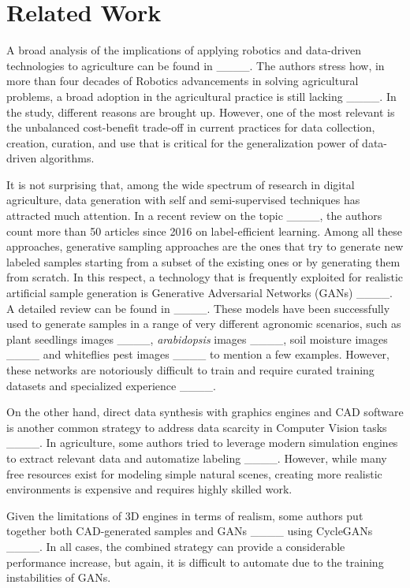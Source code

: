 \section{Related Work}
\label{sec::related}
A broad analysis of the implications of applying robotics and data-driven technologies to agriculture can be found in ____. The authors stress how, in more than four decades of Robotics advancements in solving agricultural problems, a broad adoption in the agricultural practice is still lacking ____. In the study, different reasons are brought up. However, one of the most relevant is the unbalanced cost-benefit trade-off in current practices for data collection, creation, curation, and use that is critical for the generalization power of data-driven algorithms. 

It is not surprising that, among the wide spectrum of research in digital agriculture, data generation with self and semi-supervised techniques has attracted much attention. In a recent review on the topic ____, the authors count more than 50 articles since 2016 on label-efficient learning. Among all these approaches, generative sampling approaches are the ones that try to generate new labeled samples starting from a subset of the existing ones or by generating them from scratch. In this respect, a technology that is frequently exploited for realistic artificial sample generation is Generative Adversarial Networks (GANs) ____. A detailed review can be found in ____. These models have been successfully used to generate samples in a range of very different agronomic scenarios, such as plant seedlings images ____, \textit{arabidopsis} images ____, soil moisture images ____ and whiteflies pest images ____ to mention a few examples. However, these networks are notoriously difficult to train and require curated training datasets and specialized experience ____. 

On the other hand, direct data synthesis with graphics engines and CAD software is another common strategy to address data scarcity in Computer Vision tasks ____. In agriculture, some authors tried to leverage modern simulation engines to extract relevant data and automatize labeling ____. However, while many free resources exist for modeling simple natural scenes, creating more realistic environments is expensive and requires highly skilled work. 

Given the limitations of 3D engines in terms of realism, some authors put together both CAD-generated samples and GANs ____ using CycleGANs ____. 
In all cases, the combined strategy can provide a considerable performance increase, but again, it is difficult to automate due to the training instabilities of GANs.

